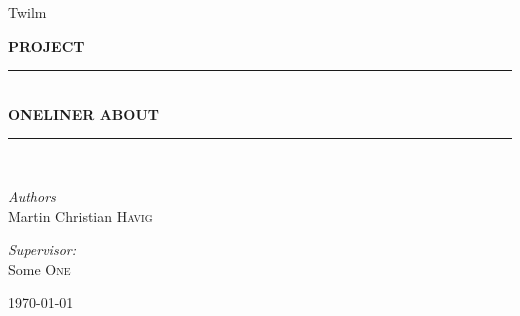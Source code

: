 \documentclass[10pt,a4paper,oneside]{report}
\newcommand{\HRule}{\rule{\linewidth}{0.5mm}}
\begin{document}
\thispagestyle{empty}
\begin{center}
	{\Huge Twilm} \\
	\medskip

    { \Large \bfseries PROJECT}
    \HRule \\[0.5cm]
	{ \huge \bfseries ONELINER ABOUT \\[0.4cm]}

    \HRule \\[0.5cm]

    \begin{minipage}{0.4\textwidth}
        \begin{flushleft} \large
            \emph{Authors}\\
            Martin Christian \textsc{Havig} \\
        \end{flushleft}
    \end{minipage}
    \begin{minipage}{0.4\textwidth}
        \begin{flushright} \large
            \emph{Supervisor:} \\
            Some  \textsc{One}
        \end{flushright}
    \end{minipage}

    \vfill
    \today \\\ \\\
\end{center}
\newpage

\renewcommand{\abstractname}{Acknowledgments}
\begin{abstract}
\end{abstract}

\renewcommand{\abstractname}{Abstract}
\begin{abstract}

\end{abstract}

\setcounter{tocdepth}{2}
\dominitoc
\dominilof
\dominilot
\tableofcontents
\clearpage
\listoffigures
\listoftables

\setcounter{tocdepth}{1}












\newpage
{}

\end{document}
